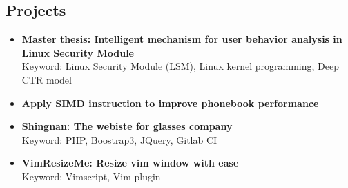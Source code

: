 \documentclass[12pt]{article}
\begin{document}
\begin{CJK*}{UTF8}{bsmi}
	\section*{Projects}
	\nointerlineskip
		\begin{itemize}
		\item \textbf{Master thesis:
			Intelligent mechanism for user behavior analysis in Linux Security Module}
			\\ {\color{gray} Keyword: Linux Security Module (LSM), Linux kernel programming, Deep CTR model}

		\item \textbf{Apply SIMD instruction to improve phonebook performance}
		\item \textbf{Shingnan: The webiste for glasses company}
			  \\ {\color{gray} Keyword: PHP, Boostrap3, JQuery, Gitlab CI}
		\item \textbf{VimResizeMe: Resize vim window with ease}
			  \\ {\color{gray} Keyword: Vimscript, Vim plugin}
		\end{itemize}

	\end{CJK*}
\end{document}
